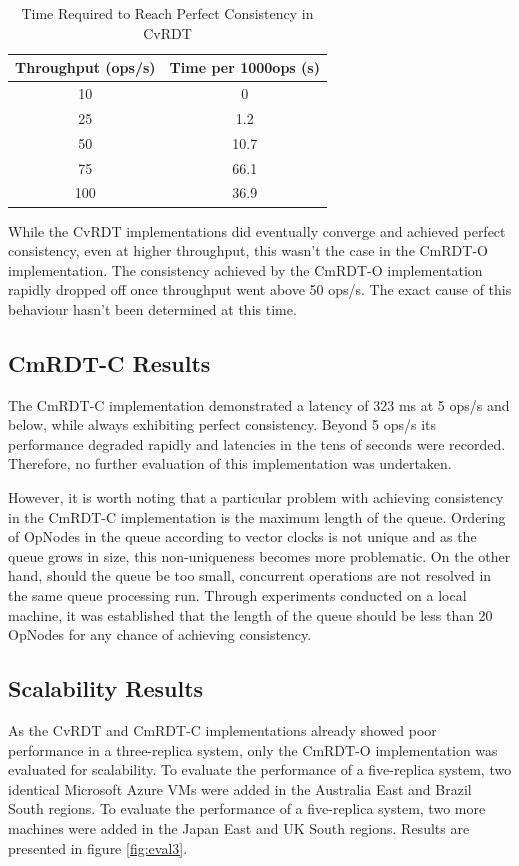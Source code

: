 \documentclass[sigconf,nonacm,10pt]{acmart}
\begin{document}
\begin{table}
  \caption{Time Required to Reach Perfect Consistency in CvRDT}
  \label{tbl}
  \begin{tabular}{cc}
    \toprule
    Throughput (ops/s) &Time per 1000ops (s)\\
    \midrule
    10 & 0 \\
    25 & 1.2 \\
    50 & 10.7 \\
    75 & 66.1 \\
    100 & 36.9 \\
  \bottomrule
\end{tabular}
\end{table}

While the CvRDT implementations did eventually converge and achieved perfect consistency, even at higher throughput, this wasn't the case in the CmRDT-O implementation. The consistency achieved by the CmRDT-O implementation rapidly dropped off once throughput went above 50 ops/s. The exact cause of this behaviour hasn't been determined at this time.

\subsection{CmRDT-C Results}
The CmRDT-C implementation demonstrated a latency of 323 ms at 5 ops/s and below, while always exhibiting perfect consistency. Beyond 5 ops/s its performance degraded rapidly and latencies in the tens of seconds were recorded. Therefore, no further evaluation of this implementation was undertaken.

However, it is worth noting that a particular problem with achieving consistency in the CmRDT-C implementation is the maximum length of the queue. Ordering of OpNodes in the queue according to vector clocks is not unique and as the queue grows in size, this non-uniqueness becomes more problematic. On the other hand, should the queue be too small, concurrent operations are not resolved in the same queue processing run. Through experiments conducted on a local machine, it was established that the length of the queue should be less than 20 OpNodes for any chance of achieving consistency.

\subsection{Scalability Results}
As the CvRDT and CmRDT-C implementations already showed poor performance in a three-replica system, only the CmRDT-O implementation was evaluated for scalability. To evaluate the performance of a five-replica system, two identical Microsoft Azure VMs were added in the Australia East and Brazil South regions. To evaluate the performance of a five-replica system, two more machines were added in the Japan East and UK South regions. Results are presented in figure \ref{fig:eval3}.
\end{document}
